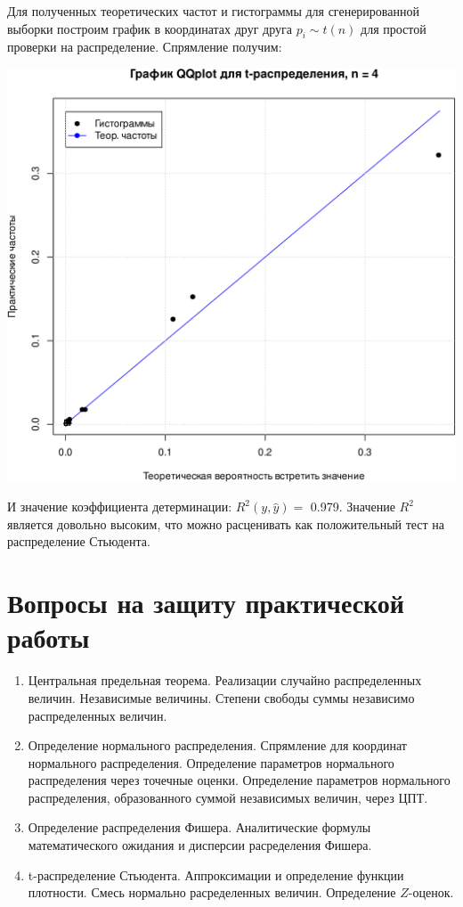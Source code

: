 \documentclass[
]{article}
\begin{document}
Для полученных теоретических частот и гистограммы для сгенерированной
выборки построим график в координатах друг друга \(p_i \sim t(n)\) для
простой проверки на распределение. Спрямление получим:

\begin{center}\includegraphics[width=0.6\linewidth]{Prac4_files/figure-latex/unnamed-chunk-11-1} \end{center}

И значение коэффициента детерминации: \(R^2(y, \hat{y}) =\) 0.979.
Значение \(R^2\) является довольно высоким, что можно расценивать как
положительный тест на распределение Стьюдента.

\hypertarget{ux432ux43eux43fux440ux43eux441ux44b-ux43dux430-ux437ux430ux449ux438ux442ux443-ux43fux440ux430ux43aux442ux438ux447ux435ux441ux43aux43eux439-ux440ux430ux431ux43eux442ux44b}{%
\section{\texorpdfstring{\textbf{Вопросы на защиту практической
работы}}{Вопросы на защиту практической работы}}\label{ux432ux43eux43fux440ux43eux441ux44b-ux43dux430-ux437ux430ux449ux438ux442ux443-ux43fux440ux430ux43aux442ux438ux447ux435ux441ux43aux43eux439-ux440ux430ux431ux43eux442ux44b}}

\begin{enumerate}
\def\labelenumi{\arabic{enumi}.}
\item
  Центральная предельная теорема. Реализации случайно распределенных
  величин. Независимые величины. Степени свободы суммы независимо
  распределенных величин.
\item
  Определение нормального распределения. Спрямление для координат
  нормального распределения. Определение параметров нормального
  распределения через точечные оценки. Определение параметров
  нормального распределения, образованного суммой независимых величин,
  через ЦПТ.
\item
  Определение распределения Фишера. Аналитические формулы
  математического ожидания и дисперсии расределения Фишера.
\item
  t-распределение Стьюдента. Аппроксимации и определение функции
  плотности. Смесь нормально расределенных величин. Определение
  \(Z\)-оценок.
\end{enumerate}
\end{document}
